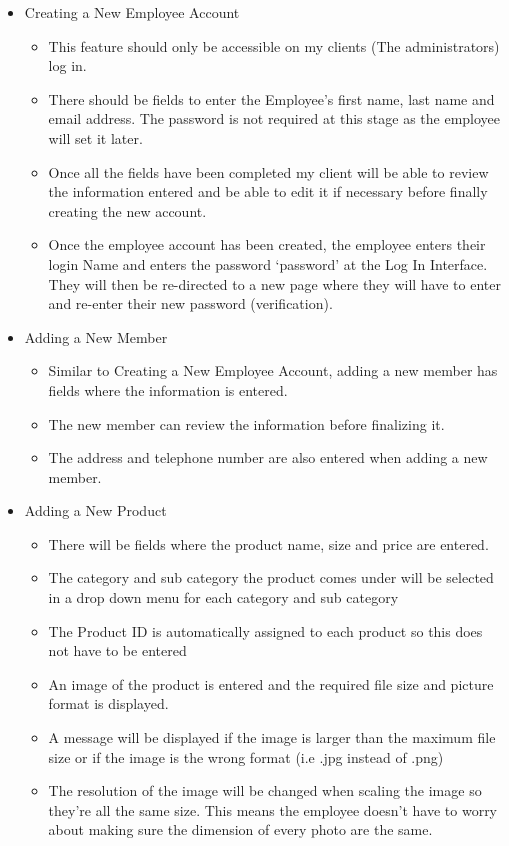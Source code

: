 \begin{itemize}
	\item Creating a New Employee Account
	\begin{itemize}
		\item This feature should only be accessible on my clients (The administrators) log in.
		\item There should be fields to enter the Employee's first name, last name and email address. The password is not required at this stage as the employee will set it later.
		\item Once all the fields have been completed my client will be able to review the information entered and be able to edit it if necessary before finally creating the new account.
		\item Once the employee account has been created, the employee enters their login Name and enters the password ‘password’ at the Log In Interface. They will then be re-directed to a new page where they will have to enter and re-enter their new password (verification). 
	\end{itemize}

\pagebreak

	\item Adding a New Member
	\begin{itemize}
		\item Similar to Creating a New Employee Account, adding a new member has fields where the information is entered.
		\item The new member can review the information before finalizing it.
		\item The address and telephone number are also entered when adding a new member.
	\end{itemize}

	\item{Adding a New Product}
	\begin{itemize}
		\item There will be fields where the product name, size and price are entered.
		\item The category and sub category the product comes under will be selected in a drop down menu for each category and sub category
		\item The Product ID is automatically assigned to each product so this does not have to be entered
		\item An image of the product is entered and the required file size and picture format is displayed.
		\item A message will be displayed if the image is larger than the maximum file size or if the image is the wrong format (i.e .jpg instead of .png)
		\item The resolution of the image will be changed when scaling the image so they're all the same size. This means the employee doesn't have to worry about making sure the dimension of every photo are the same.
	\end{itemize}


\end{itemize}
